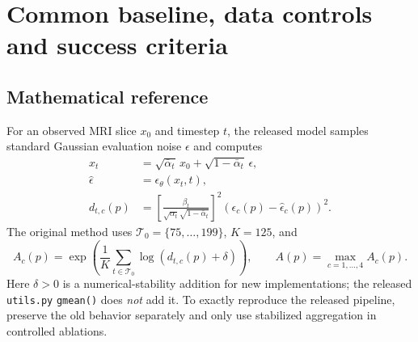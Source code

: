 \documentclass[10pt,a4paper]{article}
\newcommand{\file}[1]{\nolinkurl{#1}}
\begin{document}
\section{Common baseline, data controls and success criteria}
\subsection{Mathematical reference}
For an observed MRI slice $x_0$ and timestep $t$, the released model samples standard Gaussian evaluation noise $\epsilon$ and computes
\begin{align}
 x_t &=\sqrt{\bar\alpha_t}\,x_0 + \sqrt{1-\bar\alpha_t}\,\epsilon,\\
 \widehat\epsilon &=\epsilon_\theta(x_t,t),\\
 d_{t,c}(p)&=\left[\frac{\beta_t}{\sqrt{\alpha_t}\sqrt{1-\bar\alpha_t}}\right]^2
 (\epsilon_c(p)-\widehat\epsilon_c(p))^2.
\end{align}
The original method uses $\mathcal T_0=\{75,\ldots,199\}$, $K=125$, and
\begin{equation}
 A_c(p)=\exp\!\left(\frac{1}{K}\sum_{t\in\mathcal T_0}\log(d_{t,c}(p)+\delta)\right),\qquad
 A(p)=\max_{c=1,\ldots,4}A_c(p).
\end{equation}
Here $\delta>0$ is a numerical-stability addition for new implementations; the released \file{utils.py} \file{gmean()} does \emph{not} add it. To exactly reproduce the released pipeline, preserve the old behavior separately and only use stabilized aggregation in controlled ablations.
\end{document}
